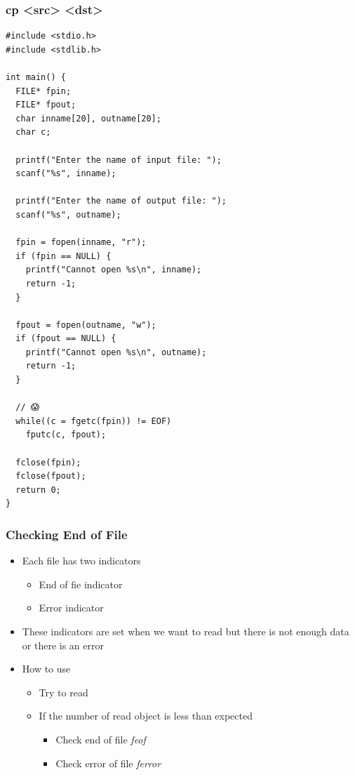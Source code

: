 \documentclass{../c-lecture}
\begin{document}
\begin{frame}[fragile]
  \frametitle{cp <src> <dst>}
  \tiny
  \begin{verbatim}
#include <stdio.h>
#include <stdlib.h>

int main() {
  FILE* fpin;
  FILE* fpout;
  char inname[20], outname[20];
  char c;

  printf("Enter the name of input file: ");
  scanf("%s", inname);

  printf("Enter the name of output file: ");
  scanf("%s", outname);

  fpin = fopen(inname, "r");
  if (fpin == NULL) {
    printf("Cannot open %s\n", inname);
    return -1;
  }

  fpout = fopen(outname, "w");
  if (fpout == NULL) {
    printf("Cannot open %s\n", outname);
    return -1;
  }

  // 😱
  while((c = fgetc(fpin)) != EOF)
    fputc(c, fpout);

  fclose(fpin);
  fclose(fpout);
  return 0;
}
  \end{verbatim}
\end{frame}

\begin{frame}
  \frametitle{Checking End of File}
  \begin{itemize}
    \item Each file has two indicators
    \begin{itemize}
      \item End of fie indicator
      \item Error indicator
    \end{itemize}
    \item
      These indicators are set when we want to read but there is not enough
      data or there is an error
    \item How to use
    \begin{itemize}
      \item Try to read
      \item If the number of read object is less than expected
      \begin{itemize}
        \item Check end of file \textrightarrow \textit{\color{YellowOrange} feof}
        \item Check error of file \textrightarrow \textit{\color{LimeGreen} ferror}
      \end{itemize}
    \end{itemize}
  \end{itemize}
\end{frame}
\end{document}
